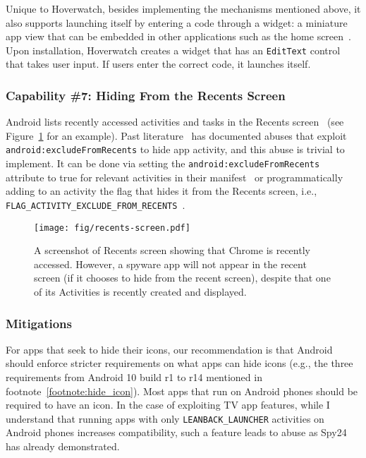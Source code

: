 Unique to Hoverwatch, besides implementing the mechanisms mentioned above, it also supports launching itself by entering a
code through a widget: a miniature app view that can be embedded in other
applications such as the home screen~\cite{Appwidge49:online}. Upon installation,
Hoverwatch creates a widget that has an \texttt{EditText} control that takes user input. If users
enter the correct code, it launches itself.



\subsubsection*{Capability \#7: Hiding From the Recents Screen}

Android lists recently accessed activities and tasks in the Recents
screen~\cite{Recentss9:online} (see Figure~\ref{fig:recents_screen} for an
example). Past literature~\cite{shan2018self, zhou2020demystifying} has
documented abuses that exploit \texttt{android:excludeFromRecents}
to hide app activity, and this abuse is trivial to implement. It can be done via
setting the \texttt{android:excludeFromRecents} attribute to true for relevant
activities in their manifest~\cite{activity72:online} or programmatically adding to an
activity
the flag that hides it from the Recents screen, i.e.,
\texttt{FLAG\_ACTIVITY\_EXCLUDE\_FROM\_RECENTS}~\cite{IntentAn90:online}.

\begin{figure}[t]
\centering
\texttt{[image: fig/recents-screen.pdf]}
\caption[Recent Apps Screen Example]{A screenshot of Recents screen showing that Chrome is recently accessed. However, a spyware app will not appear in the recent screen (if it chooses to hide from the recent screen), despite that one of its Activities is recently created and displayed.}
\label{fig:recents_screen}
\end{figure}


\subsubsection{Mitigations}
For apps that seek to hide their icons, our recommendation is that Android should enforce stricter requirements on what apps can hide icons (e.g., the three requirements from Android 10 build r1 to r14 mentioned in footnote~\ref{footnote:hide_icon}).
Most apps that run on Android phones should be required to have an icon. In the case of exploiting TV app features, while I
understand that running apps with only \texttt{LEANBACK\_LAUNCHER} activities on
Android phones increases compatibility, such a feature leads to abuse as Spy24
has already demonstrated.

